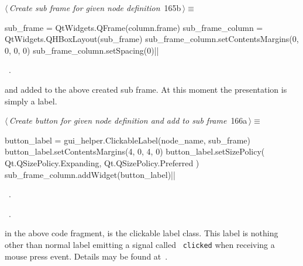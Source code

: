 \documentclass[%
    a4paper,    %
    justified,  %
    nobib,      %
    openany     %
]{tufte-book}
\makeatletter
\renewcommand{\label}[1]{\@tufte@label{##1}}%
\makeatother
\begin{document}
\begin{flushleft} \small
\begin{minipage}{\linewidth}\label{scrap160}\raggedright\small
{} $\langle\,${\itshape Create sub frame for given node definition}\nobreak\ {\footnotesize {165b}}$\,\rangle\equiv$
\vspace{-1ex}
\begin{pythoncode}
    sub_frame = QtWidgets.QFrame(column.frame)
    sub_frame_column = QtWidgets.QHBoxLayout(sub_frame)
    sub_frame_column.setContentsMargins(0, 0, 0, 0)
    sub_frame_column.setSpacing(0)|\NWsep|
\end{pythoncode}
\vspace{1.5ex}
\footnotesize
\begin{list}{}{\setlength{\itemsep}{-\parsep}\setlength{\itemindent}{-\leftmargin}}
\item \NWtxtMacroRefIn\ .

\item{}
\end{list}
\end{minipage}\vspace{4ex}
\end{flushleft}
 and added to the above
created sub frame. At this moment the presentation is simply a label.

\begin{flushleft} \small
\begin{minipage}{\linewidth}\label{scrap161}\raggedright\small
{} $\langle\,${\itshape Create button for given node definition and add to sub frame}\nobreak\ {\footnotesize {166a}}$\,\rangle\equiv$
\vspace{-1ex}
\begin{pythoncode}
    button_label = gui_helper.ClickableLabel(node_name, sub_frame)
    button_label.setContentsMargins(4, 0, 4, 0)
    button_label.setSizePolicy(
        Qt.QSizePolicy.Expanding, Qt.QSizePolicy.Preferred
    )
    sub_frame_column.addWidget(button_label)|\NWsep|
\end{pythoncode}
\vspace{1.5ex}
\footnotesize
\begin{list}{}{\setlength{\itemsep}{-\parsep}\setlength{\itemindent}{-\leftmargin}}
\item \NWtxtMacroDefBy\ .
\item \NWtxtMacroRefIn\ .

\item{}
\end{list}
\end{minipage}\vspace{4ex}
\end{flushleft}
 in the above code fragment, is the
clickable label class. This label is nothing other than normal label emitting a
signal called ~\verb=clicked= when receiving a mouse press event. Details may be
found at~.
\end{document}
